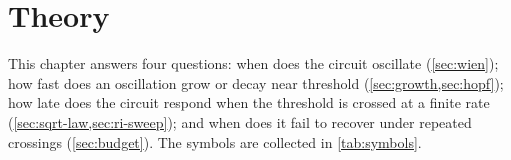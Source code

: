 \chapter{Theory}\label{ch:theory}
\chapterlists

This chapter answers four questions: when does the circuit oscillate (\cref{sec:wien}); how fast does an
oscillation grow or decay near threshold (\cref{sec:growth,sec:hopf}); how late does the circuit respond
when the threshold is crossed at a finite rate (\cref{sec:sqrt-law,sec:ri-sweep}); and when does it fail
to recover under repeated crossings (\cref{sec:budget}). The symbols are collected in
\cref{tab:symbols}.


